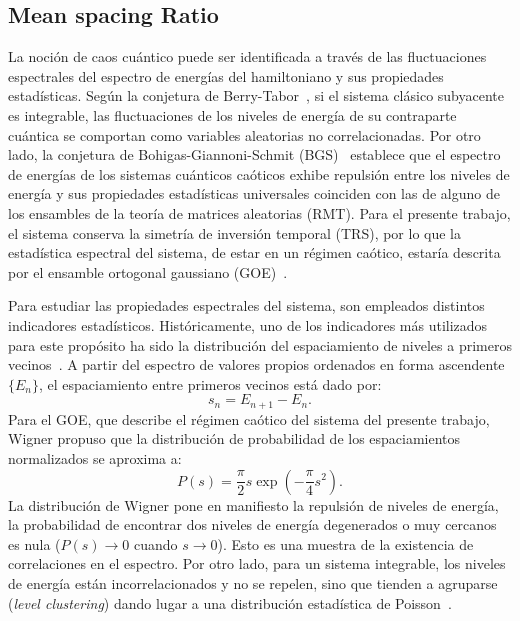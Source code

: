 \documentclass[10pt,a4paper]{article}
\begin{document}
\subsection{Mean spacing Ratio}\label{sec:mean:r}
La noción de caos cuántico puede ser identificada a través de las fluctuaciones espectrales del espectro de energías del hamiltoniano y sus propiedades estadísticas. Según la conjetura de Berry-Tabor~\cite{BerryTabor1977}, si el sistema clásico subyacente es integrable,
 las fluctuaciones de los niveles de energía de su contraparte cuántica se comportan como variables aleatorias no correlacionadas. Por otro lado, la conjetura de Bohigas-Giannoni-Schmit (BGS)~\cite{Bohigas_1984} establece que el espectro de energías de los sistemas cuánticos caóticos exhibe repulsión entre los niveles de energía y sus propiedades estadísticas universales coinciden con las de alguno de los ensambles de la teoría de matrices aleatorias (RMT). Para el presente trabajo, el sistema conserva la simetría de inversión temporal (TRS), por lo que la estadística espectral del sistema, de estar en un régimen caótico, estaría descrita por el ensamble ortogonal gaussiano (GOE)~\cite{mehta2004random}.

Para estudiar las propiedades espectrales del sistema, son empleados distintos indicadores estadísticos. Históricamente, uno de los indicadores más utilizados para este propósito ha sido la distribución del espaciamiento de niveles a primeros vecinos~\cite{BerryTabor1977, Bohigas_1984,Wigner1955}. A partir del espectro de valores propios ordenados en forma ascendente $\{ E_n \}$, el espaciamiento entre primeros vecinos está dado por:
\begin{equation}
    s_n = E_{n+1} - E_n.
\label{eq:spacings}
\end{equation}
Para el GOE, que describe el régimen caótico del sistema del presente trabajo, Wigner propuso que la distribución de probabilidad de los espaciamientos normalizados se aproxima a:
\begin{equation}
    P(s) = \frac{\pi}{2} s \exp\left(-\frac{\pi}{4} s^2\right).
\end{equation}
La distribución de Wigner pone en manifiesto la repulsión de niveles de energía, la probabilidad de encontrar dos niveles de energía degenerados o muy cercanos es nula ($P(s) \to 0$ cuando $s \to 0$). Esto es una muestra de la existencia de correlaciones en el espectro. Por otro lado, para un sistema integrable, los niveles de energía están incorrelacionados y no se repelen, sino que tienden a agruparse (\textit{level clustering}) dando lugar a una distribución estadística de Poisson~\cite{mehta2004random}.
\end{document}
